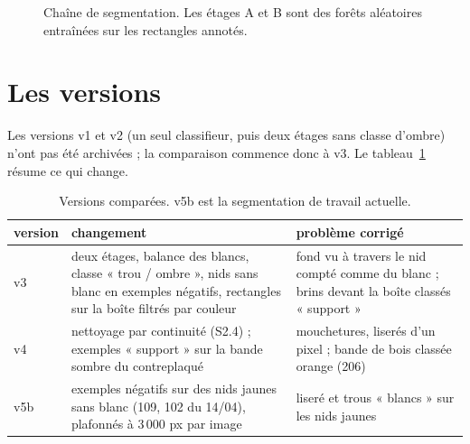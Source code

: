 \documentclass[11pt,a4paper]{article}
\begin{document}
\begin{figure}[H]
\centering
{}
\caption{Chaîne de segmentation. Les étages A et B sont des forêts aléatoires entraînées sur les
rectangles annotés.}
\label{fig:pipeline}
\end{figure}

\section{Les versions}

Les versions v1 et v2 (un seul classifieur, puis deux étages sans classe d'ombre) n'ont pas été
archivées ; la comparaison commence donc à v3. Le tableau~\ref{tab:versions} résume ce qui change.

\begin{table}[H]
\centering\small
\begin{tabular}{l p{6.2cm} p{6.0cm}}
\toprule
version & changement & problème corrigé \\
\midrule
v3 & deux étages, balance des blancs, classe « trou / ombre », nids sans blanc en exemples
négatifs, rectangles sur la boîte filtrés par couleur &
fond vu à travers le nid compté comme du blanc ; brins devant la boîte classés « support » \\
v4 & nettoyage par continuité (S2.4) ; exemples « support » sur la bande sombre du contreplaqué &
mouchetures, liserés d'un pixel ; bande de bois classée orange (206) \\
v5b & exemples négatifs sur des nids jaunes sans blanc (109, 102 du 14/04), plafonnés à 3\,000 px
par image & liseré et trous « blancs » sur les nids jaunes \\
\bottomrule
\end{tabular}
\caption{Versions comparées. v5b est la segmentation de travail actuelle.}
\label{tab:versions}
\end{table}
\end{document}
